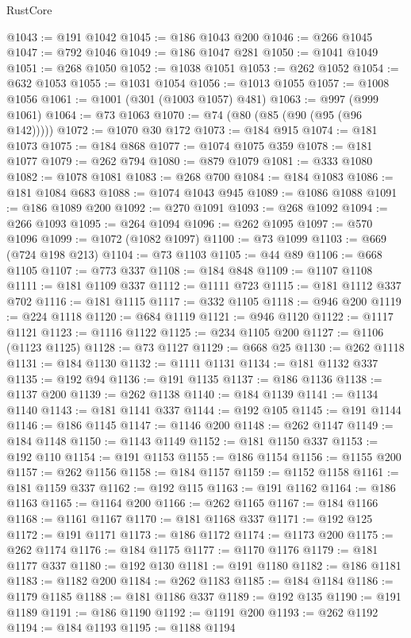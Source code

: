 \begin{lexlean}{RustCore}
\begin{coremodule}
@1043 := @191 @1042
@1045 := @186 @1043 @200
@1046 := @266 @1045
@1047 := @792 @1046
@1049 := @186 @1047 @281
@1050 := @1041 @1049
@1051 := @268 @1050
@1052 := @1038 @1051
@1053 := @262 @1052
@1054 := @632 @1053
@1055 := @1031 @1054
@1056 := @1013 @1055
@1057 := @1008 @1056
@1061 := @1001 (@301 (@1003 @1057) @481)
@1063 := @997 (@999 @1061)
@1064 := @73 @1063
@1070 := @74 (@80 (@85 (@90 (@95 (@96 @142)))))
@1072 := @1070 @30 @172
@1073 := @184 @915
@1074 := @181 @1073
@1075 := @184 @868
@1077 := @1074 @1075 @359
@1078 := @181 @1077
@1079 := @262 @794
@1080 := @879 @1079
@1081 := @333 @1080
@1082 := @1078 @1081
@1083 := @268 @700
@1084 := @184 @1083
@1086 := @181 @1084 @683
@1088 := @1074 @1043 @945
@1089 := @1086 @1088
@1091 := @186 @1089 @200
@1092 := @270 @1091
@1093 := @268 @1092
@1094 := @266 @1093
@1095 := @264 @1094
@1096 := @262 @1095
@1097 := @570 @1096
@1099 := @1072 (@1082 @1097)
@1100 := @73 @1099
@1103 := @669 (@724 @198 @213)
@1104 := @73 @1103
@1105 := @44 @89
@1106 := @668 @1105
@1107 := @773 @337
@1108 := @184 @848
@1109 := @1107 @1108
@1111 := @181 @1109 @337
@1112 := @1111 @723
@1115 := @181 @1112 @337 @702
@1116 := @181 @1115
@1117 := @332 @1105
@1118 := @946 @200
@1119 := @224 @1118
@1120 := @684 @1119
@1121 := @946 @1120
@1122 := @1117 @1121
@1123 := @1116 @1122
@1125 := @234 @1105 @200
@1127 := @1106 (@1123 @1125)
@1128 := @73 @1127
@1129 := @668 @25
@1130 := @262 @1118
@1131 := @184 @1130
@1132 := @1111 @1131
@1134 := @181 @1132 @337
@1135 := @192 @94
@1136 := @191 @1135
@1137 := @186 @1136
@1138 := @1137 @200
@1139 := @262 @1138
@1140 := @184 @1139
@1141 := @1134 @1140
@1143 := @181 @1141 @337
@1144 := @192 @105
@1145 := @191 @1144
@1146 := @186 @1145
@1147 := @1146 @200
@1148 := @262 @1147
@1149 := @184 @1148
@1150 := @1143 @1149
@1152 := @181 @1150 @337
@1153 := @192 @110
@1154 := @191 @1153
@1155 := @186 @1154
@1156 := @1155 @200
@1157 := @262 @1156
@1158 := @184 @1157
@1159 := @1152 @1158
@1161 := @181 @1159 @337
@1162 := @192 @115
@1163 := @191 @1162
@1164 := @186 @1163
@1165 := @1164 @200
@1166 := @262 @1165
@1167 := @184 @1166
@1168 := @1161 @1167
@1170 := @181 @1168 @337
@1171 := @192 @125
@1172 := @191 @1171
@1173 := @186 @1172
@1174 := @1173 @200
@1175 := @262 @1174
@1176 := @184 @1175
@1177 := @1170 @1176
@1179 := @181 @1177 @337
@1180 := @192 @130
@1181 := @191 @1180
@1182 := @186 @1181
@1183 := @1182 @200
@1184 := @262 @1183
@1185 := @184 @1184
@1186 := @1179 @1185
@1188 := @181 @1186 @337
@1189 := @192 @135
@1190 := @191 @1189
@1191 := @186 @1190
@1192 := @1191 @200
@1193 := @262 @1192
@1194 := @184 @1193
@1195 := @1188 @1194

\end{coremodule}
\end{lexlean}
